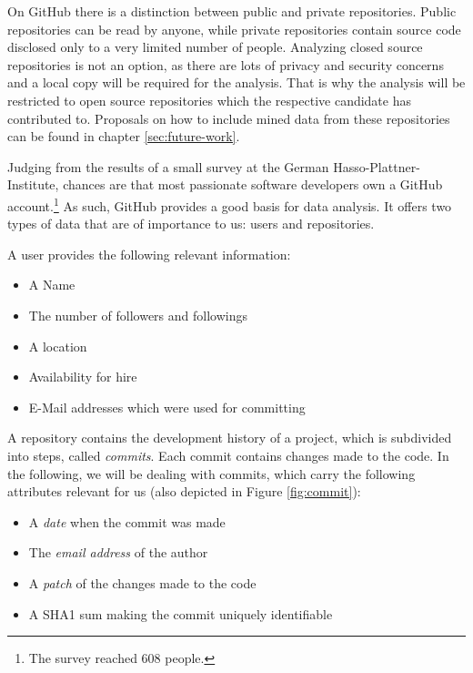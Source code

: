 On GitHub there is a distinction between public and private repositories. Public repositories can be read by anyone, while private repositories contain source code disclosed only to a very limited number of people. Analyzing closed source repositories is not an option, as there are lots of privacy and security concerns and a local copy will be required for the analysis. That is why the analysis will be restricted to open source repositories which the respective candidate has contributed to. Proposals on how to include mined data from these repositories can be found in chapter \ref{sec:future-work}.
\newline


Judging from the results of a small survey at the German Hasso-Plattner-Institute, chances are that most passionate software developers own a GitHub account.\footnote{The survey reached 608 people.}
As such, GitHub provides a  good basis for data analysis. It offers two types of data that are of importance to us: users and repositories.
\newline

A user provides the following relevant information:
\begin{itemize}
  \item A Name
  \item The number of followers and followings
  \item A location
  \item Availability for hire
  \item E-Mail addresses which were used for committing
\end{itemize}
\vspace{1em}

\noindent A repository contains the development history of a project, which is subdivided into steps, called \textit{commits}. Each commit contains changes made to the code. In the following, we will be dealing with commits, which carry the following attributes relevant for us (also depicted in Figure \ref{fig:commit}):

\begin{itemize}
    \item A \textit{date} when the commit was made
    \item The \textit{email address} of the author
    \item A \textit{patch} of the changes made to the code
    \item A SHA1 sum making the commit uniquely identifiable
\end{itemize}

